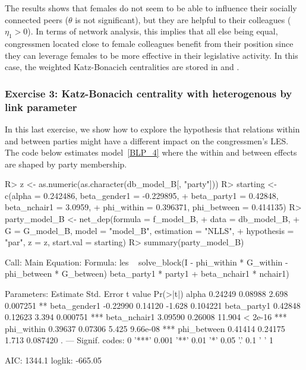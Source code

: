 \documentclass[nojss]{jss}
\begin{document}
The results shows that females do not seem to be able to influence their socially connected peers ($\theta$ is not significant), but they are helpful to their colleagues ($\eta_{1}>0$). In terms of network analysis, this implies that all else being equal, congressmen located close to female colleagues benefit from their position since they can leverage females to be more effective in their legislative activity. In this case, the weighted Katz-Bonacich centralities are stored in 
and .

\subsubsection{Exercise 3: Katz-Bonacich centrality with heterogenous by link parameter}

In this last exercise, we show how to explore the hypothesis that relations within and between parties might have a different impact on the congressmen's LES. The code below estimates model~\ref{BLP_4} where the within and between effects are shaped by party membership.

\begin{CodeChunk}
\begin{CodeInput}
R> z <- as.numeric(as.character(db_model_B[, "party"]))
R> starting <- c(alpha = 0.242486, beta_gender1 = -0.229895,
+    beta_party1 = 0.42848, beta_nchair1 = 3.0959,
+    phi_within = 0.396371, phi_between = 0.414135)
R> party_model_B <- net_dep(formula = f_model_B,
+    data = db_model_B,
+    G = G_model_B, model = "model_B", estimation = "NLLS",
+    hypothesis = "par", z = z, start.val = starting)
R> summary(party_model_B)
\end{CodeInput}
\begin{CodeOutput}
Call:
Main Equation:  
Formula: les ~ solve_block(I - phi_within * G_within - 
phi_between * G_between) %
beta_party1 * party1 + beta_nchair1 * nchair1)

Parameters:
Estimate Std. Error t value Pr(>|t|)    
alpha         0.24249    0.08988   2.698 0.007251 ** 
beta_gender1 -0.22990    0.14120  -1.628 0.104221    
beta_party1   0.42848    0.12623   3.394 0.000751 ***
beta_nchair1  3.09590    0.26008  11.904  < 2e-16 ***
phi_within    0.39637    0.07306   5.425 9.66e-08 ***
phi_between   0.41414    0.24175   1.713 0.087420 .  
---
Signif. codes:  0 '***' 0.001 '**' 0.01 '*' 0.05 '.' 0.1 ' ' 1

AIC: 1344.1  loglik: -665.05
\end{CodeOutput}
\end{CodeChunk}
\end{document}
